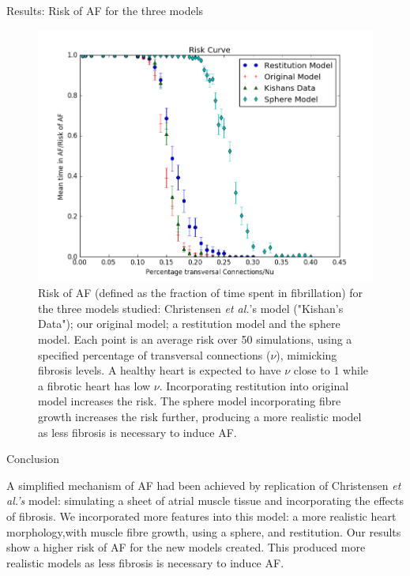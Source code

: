 \documentclass[final,hyperref={pdfpagelabels=false}]{beamer}
\begin{document}
\begin{frame}[t]
\begin{columns}[t]
\begin{column}{.465\textwidth}
\begin{block}{Results: Risk of AF for the three models}
\begin{figure}
\includegraphics[width=0.65\linewidth]{xriskcurvesphere}
\caption{Risk of AF (defined as the fraction of time spent in fibrillation) for the three models studied: Christensen \emph{et al.}'s model ("Kishan's Data"); our original model; a restitution model and the sphere model. Each point is an average risk over 50 simulations, using a specified percentage of transversal connections ($\nu$), mimicking fibrosis levels. A healthy heart is expected to have $\nu$ close to 1 while a fibrotic heart has low $\nu$. Incorporating restitution into original model increases the risk. The sphere model incorporating fibre growth increases the risk further, producing a more realistic model as less fibrosis is necessary to induce AF. }
\end{figure}

\end{block}


\begin{block}{Conclusion}

A simplified mechanism of AF had been achieved by replication of Christensen \emph{et al.'s} model: simulating a sheet of atrial muscle tissue and incorporating the effects of fibrosis. We incorporated more features into this model: a more realistic heart morphology,with muscle fibre growth, using a sphere, and restitution. Our results show a higher risk of AF for the new models created. This produced more realistic models as less fibrosis is necessary to induce AF.
\end{block}



\end{column}
\end{columns}
\end{frame}
\end{document}
